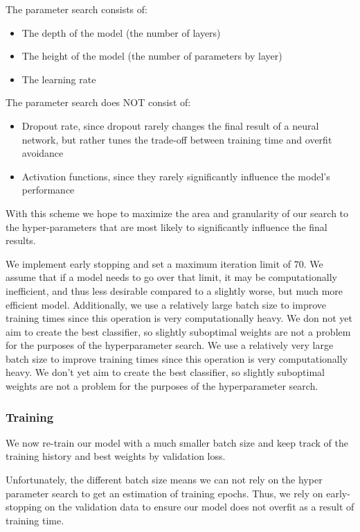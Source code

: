 \documentclass[11pt, a4paper]{article}
\begin{document}
	The parameter search consists of:
	\begin{itemize}
		\item The depth of the model (the number of layers)
		\item The height of the model (the number of parameters by layer) 
		\item The learning rate
	\end{itemize}

	
	The parameter search does NOT consist of:
	\begin{itemize}
		\item Dropout rate, since dropout rarely changes the final result of a neural network, but rather tunes the trade-off between training time and overfit avoidance
		\item Activation functions, since they rarely significantly influence the model's performance
	\end{itemize}
	
	With this scheme we hope to maximize the area and granularity of our search to the hyper-parameters that are most likely to significantly influence the final results.
	
	We implement early stopping and set a maximum iteration limit of $70$. We assume that if a model needs to go over that limit, it may be computationally inefficient, and thus less desirable compared to a slightly worse, but much more efficient model. Additionally, we use a relatively large batch size to improve training times since this operation is very computationally heavy. We don not yet aim to create the best classifier, so slightly suboptimal weights are not a problem for the purposes of the hyperparameter search.
	We use a relatively very large batch size to improve training times since this operation is very computationally heavy. We don't yet aim to create the best classifier, so slightly suboptimal weights are not a problem for the purposes of the hyperparameter search.
	
	
	\subsubsection{Training}
		
	We now re-train our model with a much smaller batch size and keep track of the training history and best weights by validation loss. 
	
	Unfortunately, the different batch size means we can not rely on the hyper parameter search to get an estimation of training epochs. Thus, we rely on early-stopping on the validation data to ensure our model does not overfit as a result of training time. 
	
\end{document}
